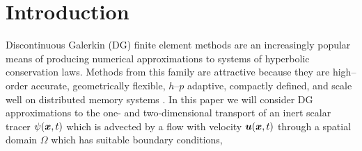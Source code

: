\documentclass{ametsoc}
\begin{document}

\section{Introduction} \label{sec:intro}
Discontinuous Galerkin (DG) finite element methods are an increasingly popular means of producing numerical approximations to systems of hyperbolic conservation laws. Methods from this family are attractive because they are high--order accurate, geometrically flexible, $h$--$p$ adaptive, compactly defined, and scale well on distributed memory systems \citep{Giraldo:2002aa}. In this paper we will consider DG approximations to the one- and two-dimensional transport of an inert scalar tracer $\psi(\boldsymbol{x},t)$ which is advected by a flow with velocity $\boldsymbol{u}(\boldsymbol{x},t)$ through a spatial domain $\Omega$ which has suitable boundary conditions,
\end{document}
